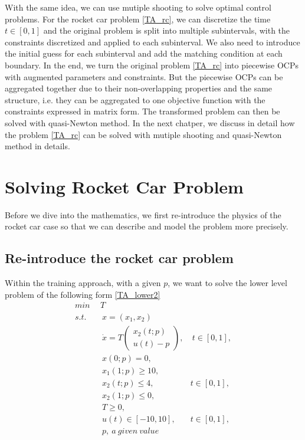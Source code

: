 \documentclass  [
  paper    = a4,
  BCOR     = 10mm,
  twoside,
  fontsize = 12pt,
  fleqn,
  toc      = bibnumbered,
  toc      = listofnumbered,
  numbers  = noendperiod,
  headings = normal,
  listof   = leveldown,
  version  = 3.03
]                                       {scrreprt}
\newcommand{\<}{\langle}
\renewcommand{\>}{\rangle}
\begin{document}
   
   With the same idea, we can use mutiple shooting to solve optimal control problems. For the rocket car problem \ref{TA_rc}, we can discretize the time $t \in [0, 1]$ and the original problem is split into multiple subintervals, with the constraints discretized and applied to each subinterval. We also need to introduce the initial guess for each subinterval and add the matching condition at each boundary. In the end, we turn the original problem  \ref{TA_rc} into piecewise OCPs with augmented parameters and constraints. But the piecewise OCPs can be aggregated together due to their non-overlapping properties and the same structure, i.e. they can be aggregated to one objective function with the constraints expressed in matrix form. The transformed problem can then be solved with quasi-Newton method. In the next chatper, we discuss in detail how the problem \ref{TA_rc} can be solved with mutiple shooting and quasi-Newton method in details. 
   
   
   \chapter{Solving Rocket Car Problem}
   Before we dive into the mathematics, we first re-introduce the physics of the rocket car case so that we can describe and model the problem more precisely. 
   \section{Re-introduce the rocket car problem}
   Within the training approach, with a given $p$, we want to solve the lower level problem of the following form \ref{TA_lower2}
   \begin{subequations}
   	\begin{align}
   	\underset{}{min} \   & \  T \\ 
   	s.t.  & \ \ x = (x_1, x_2)   \label{ta_rc_x} \\ 
   	& \ \  \dot{x} = T  \begin{pmatrix}  x_2(t;p) \\ u(t)-p   \end{pmatrix}, & \ t \in [0,1],  \label{ta_rc_partial2} \\
   	& \ \ x(0;p) = 0, \label{ta_rc_t2}\\
   	& \ \ x_1(1;p) \geq 10, \label{ta_rc_x1_t2} \\
   	& \ \ x_2(t;p) \leq 4, & t \in [0,1], \label{ta_rc_x2_tc2} \\
   	& \ \ x_2(1;p) \leq 0, \label{ta_rc_x2_t1_2}  \\
   	& \ \ T \geq 0, \\
   	& \ \ u(t) \in [-10, 10], & t \in [0,1], \label{ta_ut}\\
   	& \ \ p, \   a \ given \ value
   	\end{align}
   	\label{TA_lower2}
   \end{subequations}
   
\end{document}
